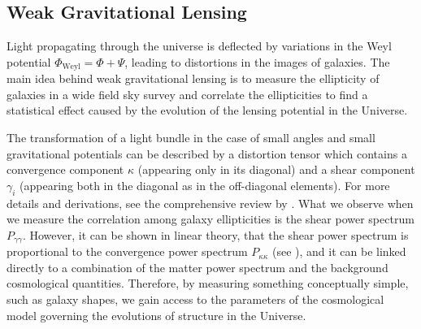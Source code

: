 \subsection{Weak Gravitational Lensing \label{sub:Weak-Lensing-Fisher}}

Light propagating through the universe is deflected by variations in the Weyl potential $\Phi_{\textrm{Weyl}}=\Phi+\Psi$,
leading to distortions in the images of galaxies. 
The main idea behind weak gravitational lensing is to measure the ellipticity of galaxies in a 
wide field sky survey and correlate the ellipticities to find a statistical effect caused by the
evolution of the lensing potential in the Universe.

The transformation of a light bundle in the case of small angles and small gravitational potentials
can be described by a distortion tensor which contains a convergence component $\kappa$ (appearing only in its diagonal) and a
shear component $\gamma_i$ (appearing both in the diagonal as in the off-diagonal elements). 
For more details and derivations, see the comprehensive review by \cite{cite Bartelmann Schneider}.
What we observe when we measure the correlation among galaxy ellipticities is the shear
power spectrum $P_{\gamma \gamma}$. However, it can be shown in linear theory, that 
the shear power spectrum is proportional to the convergence power spectrum 
$P_{\kappa \kappa}$ (see \cite{Amendola, Tegmark, Hu, Bartelmann}),
and it can be linked directly to a combination of the matter power spectrum and the background cosmological quantities.
Therefore, by measuring something conceptually simple, such as galaxy shapes, we gain
access to the parameters of the cosmological model governing the evolutions of structure in the Universe.

